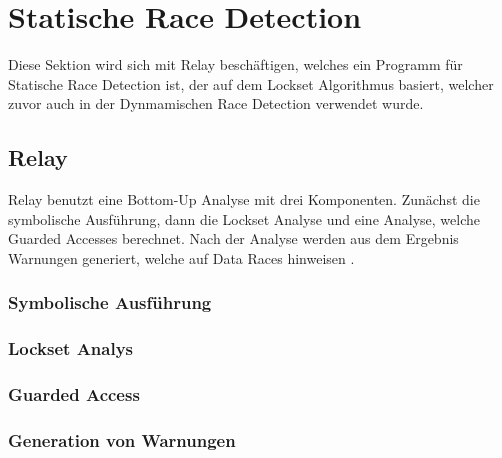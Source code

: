 \section{Statische Race Detection}

Diese Sektion wird sich mit Relay beschäftigen, welches ein Programm für Statische Race Detection ist, der auf dem Lockset Algorithmus basiert, welcher zuvor auch in der Dynmamischen Race Detection verwendet wurde.



\subsection*{Relay}

Relay benutzt eine Bottom-Up Analyse mit drei Komponenten. Zunächst die symbolische Ausführung, dann die Lockset Analyse und eine Analyse, welche Guarded Accesses berechnet. Nach der Analyse werden aus dem Ergebnis Warnungen generiert, welche auf Data Races hinweisen \cite[vgl.][208]{relay}.

\subsubsection*{Symbolische Ausführung}



\subsubsection*{Lockset Analys}

\subsubsection*{Guarded Access}

\subsubsection*{Generation von Warnungen}